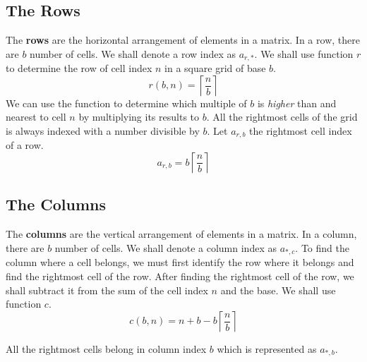 \documentclass[letterpaper, twoside,12pt]{article}
\begin{document}
    \subsection{The Rows} \label{rows}
    The \textbf{rows} are the horizontal arrangement of elements in a matrix. In a row, there are $b$ number of cells. We shall denote a row index as $a_{r,*}$. We shall use function $r$ to determine the row of cell index $n$ in a square grid of base $b$.
    \begin{equation}
        r(b,n) = \left\lceil \frac{n}{b} \right\rceil
    \end{equation}
    We can use the function to determine which multiple of $b$ is \emph{higher} than and nearest to cell $n$ by multiplying its results to $b$. All the rightmost cells of the grid is always indexed with a number divisible by $b$. Let $a_{r,b}$ the rightmost cell index of a row.
    \begin{equation}
        a_{r,b} = b\left\lceil \frac{n}{b} \right\rceil
    \end{equation}

    \subsection{The Columns} \label{columns}
    The \textbf{columns} are the vertical arrangement of elements in a matrix. In a column, there are $b$ number of cells. We shall denote a column index as $a_{*,c}$. To find the column where a cell belongs, we must first identify the row where it belongs and find the rightmost cell of the row. After finding the rightmost cell of the row, we shall subtract it from the sum of the cell index $n$ and the base. We shall use function $c$.
    \begin{equation}
        c(b,n) = n + b - b\left\lceil \frac{n}{b} \right\rceil
    \end{equation}

    All the rightmost cells belong in column index $b$ which is represented as $a_{*,b}$.

    \newpage
\end{document}
